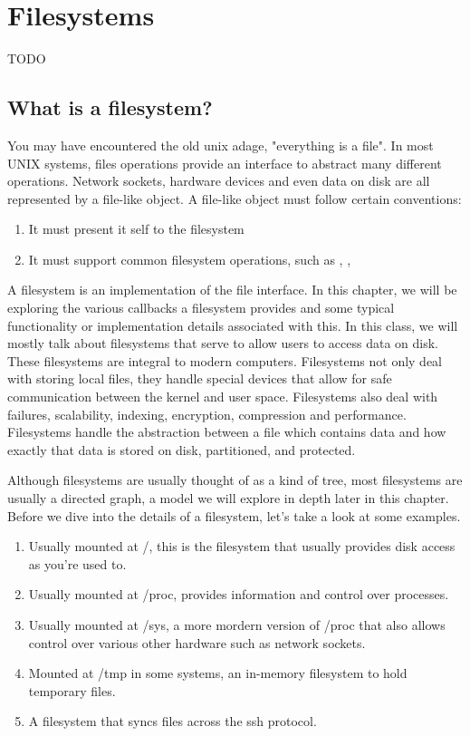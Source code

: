 \chapter{Filesystems}

\epigraph{TODO}{}

\section{What is a filesystem?}

You may have encountered the old unix adage, "everything is a file". In most UNIX systems, files operations provide an interface to abstract many different operations. Network sockets, hardware devices and even data on disk are all represented by a file-like object. A file-like object must follow certain conventions:

\begin{enumerate}
  \item It must present it self to the filesystem
  \item It must support common filesystem operations, such as , , 
\end{enumerate}

A filesystem is an implementation of the file interface. In this chapter, we will be exploring the various callbacks a filesystem provides and some typical functionality or implementation details associated with this. In this class, we will mostly talk about filesystems that serve to allow users to access data on disk. These filesystems are integral to modern computers. Filesystems not only deal with storing local files, they handle special devices that allow for safe communication between the kernel and user space. Filesystems also deal with failures, scalability, indexing, encryption, compression and performance. Filesystems handle the abstraction between a file which contains data and how exactly that data is stored on disk, partitioned, and protected.

Although filesystems are usually thought of as a kind of tree, most filesystems are usually a directed graph, a model we will explore in depth later in this chapter. Before we dive into the details of a filesystem, let's take a look at some examples.

\begin{enumerate}

  \item {} Usually mounted at /, this is the filesystem that usually provides disk access as you're used to.
  \item {} Usually mounted at /proc, provides information and control over processes.
  \item {} Usually mounted at /sys, a more mordern version of /proc that also allows control over various other hardware such as network sockets.
  \item {} Mounted at /tmp in some systems, an in-memory filesystem to hold temporary files.
  \item {} A filesystem that syncs files across the ssh protocol.

\end{enumerate}

